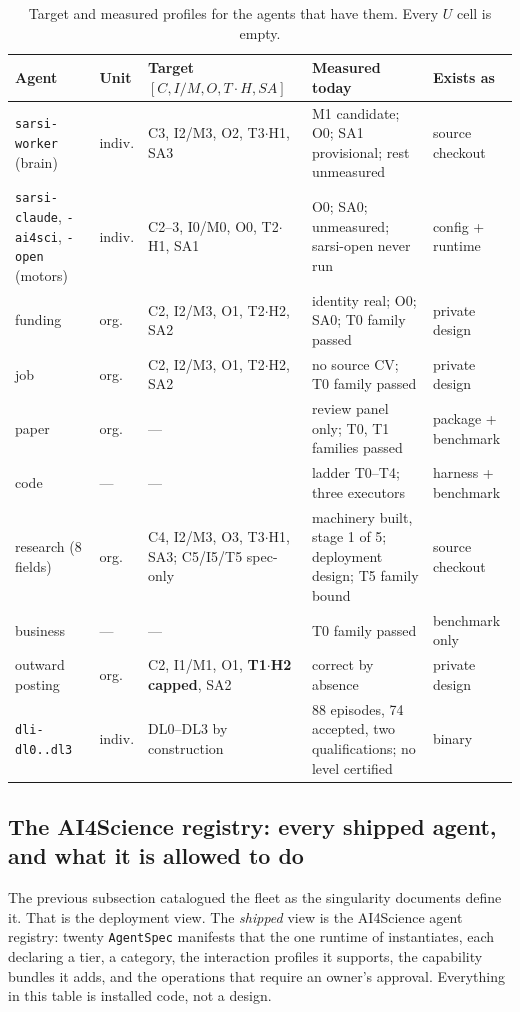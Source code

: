 \begin{table}[!htbp]
\centering\footnotesize
\begin{tabularx}{\textwidth}{@{}p{2.3cm}p{1.1cm}YYp{2.4cm}@{}}
\toprule
Agent & Unit & Target $[C, I/M, O, T{\cdot}H, SA]$ & Measured today & Exists as \\
\midrule
\texttt{sarsi-worker} (brain) & indiv. & C3, I2/M3, O2, T3$\cdot$H1, SA3 & M1 candidate; O0; SA1 provisional; rest unmeasured & source checkout \\
\texttt{sarsi-claude}, \texttt{-ai4sci}, \texttt{-open} (motors) & indiv. & C2--3, I0/M0, O0, T2$\cdot$H1, SA1 & O0; SA0; unmeasured; sarsi-open never run & config + runtime \\
funding & org. & C2, I2/M3, O1, T2$\cdot$H2, SA2 & identity real; O0; SA0; T0 family passed & private design \\
job & org. & C2, I2/M3, O1, T2$\cdot$H2, SA2 & no source CV; T0 family passed & private design \\
paper & org. & --- & review panel only; T0, T1 families passed & package + benchmark \\
code & --- & --- & ladder T0--T4; three executors & harness + benchmark \\
research (8 fields) & org. & C4, I2/M3, O3, T3$\cdot$H1, SA3; C5/I5/T5 spec-only & machinery built, stage 1 of 5; deployment design; T5 family bound & source checkout \\
business & --- & --- & T0 family passed & benchmark only \\
outward posting & org. & C2, I1/M1, O1, \textbf{T1$\cdot$H2 capped}, SA2 & correct by absence & private design \\
\texttt{dli-dl0..dl3} & indiv. & DL0--DL3 by construction & 88 episodes, 74 accepted, two qualifications; no level certified & binary \\
\bottomrule
\end{tabularx}
\caption{Target and measured profiles for the agents that have them. Every $U$ cell is empty.}
\label{tab:fleet}
\end{table}

\subsection{The AI4Science registry: every shipped agent, and what it is allowed to do}\label{sec:registry}

The previous subsection catalogued the fleet as the singularity documents define it. That is the deployment view. The \emph{shipped} view is the AI4Science agent registry: twenty \texttt{AgentSpec} manifests that the one runtime of \citet{yang2026harness} instantiates, each declaring a tier, a category, the interaction profiles it supports, the capability bundles it adds, and the operations that require an owner's approval. Everything in this table is installed code, not a design.

